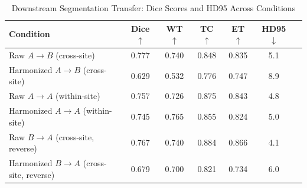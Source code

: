 \begin{table}[t]
\centering
\caption{Downstream Segmentation Transfer: Dice Scores and HD95 Across Conditions}
\label{tab:downstream}
\begin{tabular}{lcccccc}
\toprule
Condition & Dice $\uparrow$ & WT $\uparrow$ & TC $\uparrow$ & ET $\uparrow$ & HD95 $\downarrow$ \\
\midrule
Raw $A \to B$ (cross-site) & 0.777 & 0.740 & 0.848 & 0.835 & 5.1 \\
Harmonized $A \to B$ (cross-site) & 0.629 & 0.532 & 0.776 & 0.747 & 8.9 \\
\midrule
Raw $A \to A$ (within-site) & 0.757 & 0.726 & 0.875 & 0.843 & 4.8 \\
Harmonized $A \to A$ (within-site) & 0.745 & 0.765 & 0.855 & 0.824 & 5.0 \\
Raw $B \to A$ (cross-site, reverse) & 0.767 & 0.740 & 0.884 & 0.866 & 4.1 \\
Harmonized $B \to A$ (cross-site, reverse) & 0.679 & 0.700 & 0.821 & 0.734 & 6.0 \\
\bottomrule
\end{tabular}
\end{table}
